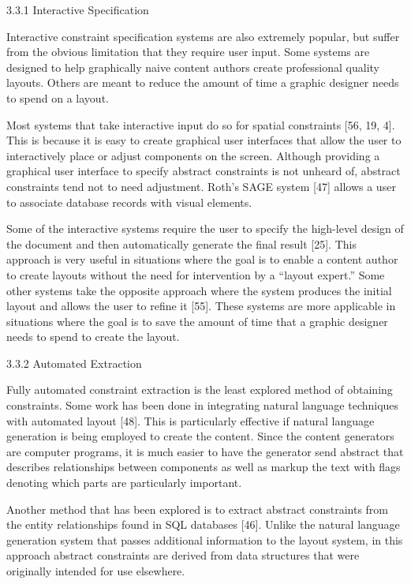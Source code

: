     3.3.1 Interactive Specification

    Interactive constraint specification systems are also extremely popular, but suffer from the obvious limitation that they require user input. Some systems are designed to help graphically naive content authors create professional quality layouts. Others are meant to reduce the amount of time a graphic designer needs to spend on a layout.

    Most systems that take interactive input do so for spatial constraints [56, 19, 4]. This is because it is easy to create graphical user interfaces that allow the user to interactively place or adjust components on the screen. Although providing a graphical user interface to specify abstract constraints is not unheard of, abstract constraints tend not to need adjustment. Roth’s SAGE system [47] allows a user to associate database records with visual elements.

    Some of the interactive systems require the user to specify the high-level design of the document and then automatically generate the final result [25]. This approach is very useful in situations where the goal is to enable a content author to create layouts without the need for intervention by a “layout expert.” Some other systems take the opposite approach where the system produces the initial layout and allows the user to refine it [55]. These systems are more applicable in situations where the goal is to save the amount of time that a graphic designer needs to spend to create the layout.

    3.3.2 Automated Extraction

    Fully automated constraint extraction is the least explored method of obtaining constraints. Some work has been done in integrating natural language techniques with automated layout [48]. This is particularly effective if natural language generation is being employed to create the content. Since the content generators are computer programs, it is much easier to have the generator send abstract that describes relationships between components as well as markup the text with flags denoting which parts are particularly important.

    Another method that has been explored is to extract abstract constraints from the entity relationships found in SQL databases [46]. Unlike the natural language generation system that passes additional information to the layout system, in this approach abstract constraints are derived from data structures that were originally intended for use elsewhere.

